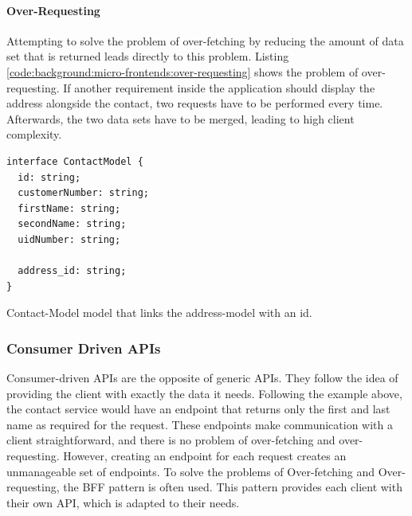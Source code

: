 \paragraph{Over-Requesting}\label{paragraph:background:micro-frontend:generic-vs-consumer-driven-apis:generic-apis:over-requesting}

Attempting to solve the problem of over-fetching by reducing the amount of data set that is returned leads directly to this problem. Listing \ref{code:background:micro-frontends:over-requesting} shows the problem of over-requesting. If another requirement inside the application should display the address alongside the contact, two requests have to be performed every time. Afterwards, the two data sets have to be merged, leading to high client complexity. \cite{misc:2019:leitner:background:micro-frontends:backend-for-frontends}

\ifshowListings
\begin{listing}[H]
    \begin{verbatim}
interface ContactModel {
  id: string;
  customerNumber: string;
  firstName: string;
  secondName: string;
  uidNumber: string;

  address_id: string;
}
    \end{verbatim}
    \caption{Contact-Model model that links the address-model with an id.}\label{code:background:micro-frontends:over-requesting}
\end{listing}
\fi

\subsubsection{Consumer Driven \acp{API}}\label{subsubection:background:micro-frontend:generic-vs-consumer-driven-apis:consumer-driven-apis}

Consumer-driven \acp{API} are the opposite of generic \acp{API}. They follow the idea of providing the client with exactly the data it needs. Following the example above, the contact service would have an endpoint that returns only the first and last name as required for the request. These endpoints make communication with a client straightforward, and there is no problem of over-fetching and over-requesting. However, creating an endpoint for each request creates an unmanageable set of endpoints.  \cite{misc:2019:leitner:background:micro-frontends:backend-for-frontends} To solve the problems of Over-fetching and Over-requesting, the \ac{BFF} pattern is often used. This pattern provides each client with their own \ac{API}, which is adapted to their needs. \cite{book:2018:richardson:background:bff:microservices-patterns}

